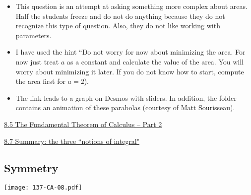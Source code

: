 \documentclass[11pt]{article}
\newcommand{\nl}{\hfill \vspace{-1.1\baselineskip}} %
\newcommand{\vv}{\hspace{8mm} \href{https://www.youtube.com/watch?v=OKw2v0DOXOI&list=PLlwePzQY_wW_8-sITAbG_GU2JgiuwXkDN&index=5}{8.5 The Fundamental Theorem of Calculus -- Part 2}}
\newcommand{\vvii}{\hspace{8mm} \href{https://www.youtube.com/watch?v=LBhvzrRyAtk&list=PLlwePzQY_wW_8-sITAbG_GU2JgiuwXkDN&index=7}{8.7 Summary: the three ``notions of integral"}}
\begin{document}
\begin{comments}
\nl
	\begin{itemize}
		\item This question is an attempt at asking something more complex about areas.  Half the students freeze and do not do anything because they do not recognize this type of question.  Also, they do not like working with parameters. 
		
		\item  I have used the hint ``Do not worry for now about minimizing the area.  For now just treat $a$ as a constant and calculate the value of the area.  You will worry about minimizing it later.  If you do not know how to start, compute the area first for $a=2$). 
		
		\item The link leads to a graph on Desmos with sliders.  In addition, the folder contains an animation of these parabolas (courtesy of Matt Sourisseau).
	\end{itemize}
\end{comments}

\begin{videos}
\vv

\vvii
\end{videos}

\newpage
\subsection{Symmetry}

\begin{center}
{ \texttt{[image: 137-CA-08.pdf]}} 
\end{center}
\end{document}
